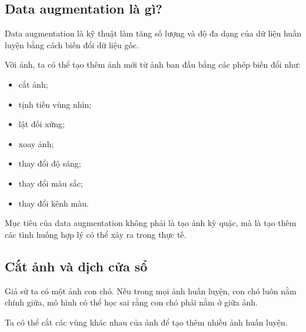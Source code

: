 \subsection{Data augmentation là gì?}

Data augmentation là kỹ thuật làm tăng số lượng và độ đa dạng của dữ liệu huấn luyện bằng cách biến đổi dữ liệu gốc.

Với ảnh, ta có thể tạo thêm ảnh mới từ ảnh ban đầu bằng các phép biến đổi như:

\begin{itemize}
    \item cắt ảnh;
    \item tịnh tiến vùng nhìn;
    \item lật đối xứng;
    \item xoay ảnh;
    \item thay đổi độ sáng;
    \item thay đổi màu sắc;
    \item thay đổi kênh màu.
\end{itemize}

\begin{ghinho}
Mục tiêu của data augmentation không phải là tạo ảnh kỳ quặc, mà là tạo thêm các tình huống hợp lý có thể xảy ra trong thực tế.
\end{ghinho}

\subsection{Cắt ảnh và dịch cửa sổ}

Giả sử ta có một ảnh con chó. Nếu trong mọi ảnh huấn luyện, con chó luôn nằm chính giữa, mô hình có thể học sai rằng con chó phải nằm ở giữa ảnh.

Ta có thể cắt các vùng khác nhau của ảnh để tạo thêm nhiều ảnh huấn luyện.

\begin{center}
\end{center}

